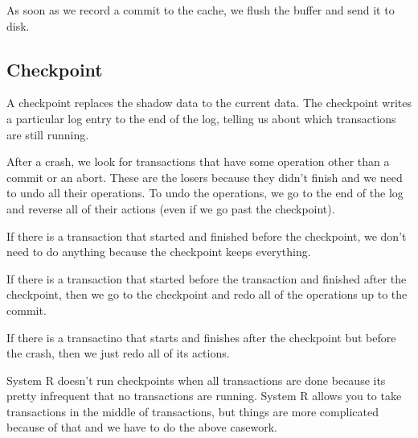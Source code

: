 \documentclass[psamsfonts]{amsart}
\begin{document}
As soon as we record a commit to the cache, we flush the buffer and send it to disk.

\subsection{Checkpoint}

A checkpoint replaces the shadow data to the current data. The checkpoint writes a particular log entry to the end of the log, telling us about which transactions are still running.

After a crash, we look for transactions that have some operation other than a commit or an abort. These are the losers because they didn't finish and we need to undo all their operations. To undo the operations, we go to the end of the log and reverse all of their actions (even if we go past the checkpoint).

If there is a transaction that started and finished before the checkpoint, we don't need to do anything because the checkpoint keeps everything.

If there is a transaction that started before the transaction and finished after the checkpoint, then we go to the checkpoint and redo all of the operations up to the commit.

If there is a transactino that starts and finishes after the checkpoint but before the crash, then we just redo all of its actions.

System R doesn't run checkpoints when all transactions are done because its pretty infrequent that no transactions are running. System R allows you to take transactions in the middle of transactions, but things are more complicated because of that and we have to do the above casework.
\end{document}
